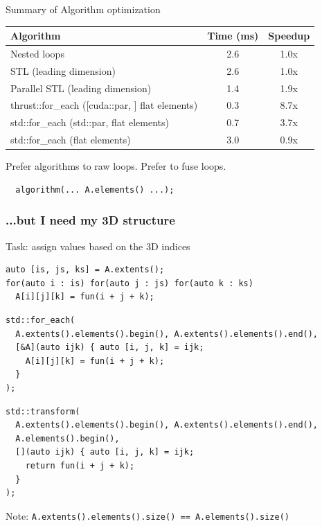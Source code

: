 \documentclass[t,aspectratio=169,handout]{beamer}
\begin{document}
\begin{frame}[fragile,label=algo7]{Summary of Algorithm optimization}

\begin{table}
\begin{tabular}{lcc}
\textbf{Algorithm} & \textbf{Time (ms)} & \textbf{Speedup} \\
\hline
Nested loops                                    & 2.6 & 1.0x \\
STL (leading dimension)                         & 2.6 & 1.0x \\
Parallel STL (leading dimension)                & 1.4 & 1.9x \\
\hline
thrust::for\_each ([cuda::par, ] flat elements) & 0.3 & 8.7x \\
std::for\_each (std::par, flat elements)        & 0.7 & 3.7x \\
std::for\_each (flat elements)                  & 3.0 & 0.9x \\
\end{tabular}
\end{table}

\begin{alertblock}{}
  Prefer algorithms to raw loops.
  Prefer to fuse loops.
\end{alertblock}

  \begin{lstlisting}
  algorithm(... A.elements() ...);
  \end{lstlisting}

\end{frame}

\begin{frame}[fragile,label=algo8]
\frametitle{...but I need my 3D structure}

Task: assign values based on the 3D indices

\begin{lstlisting}
auto [is, js, ks] = A.extents();
for(auto i : is) for(auto j : js) for(auto k : ks)
  A[i][j][k] = fun(i + j + k);
\end{lstlisting}

\begin{overprint}
\begin{lstlisting}
std::for_each(
  A.extents().elements().begin(), A.extents().elements().end(),
  [&A](auto ijk) { auto [i, j, k] = ijk;
    A[i][j][k] = fun(i + j + k);
  }
);
\end{lstlisting}

\begin{lstlisting}
std::transform(
  A.extents().elements().begin(), A.extents().elements().end(),
  A.elements().begin(),
  [](auto ijk) { auto [i, j, k] = ijk;
    return fun(i + j + k);
  }
);
\end{lstlisting}

Note: \lstinline|A.extents().elements().size() == A.elements().size()|
\end{overprint}

\end{frame}
\end{document}
